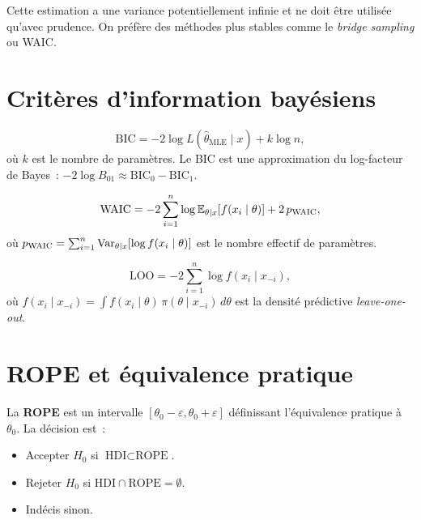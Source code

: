 \begin{attention}[title=\textbf{Instabilit\'e de la moyenne harmonique}]
Cette estimation a une variance potentiellement infinie et ne doit
\^etre utilis\'ee qu'avec prudence. On pr\'ef\`ere des m\'ethodes plus
stables comme le \textit{bridge sampling} ou WAIC.
\end{attention}

\section{Crit\`eres d'information bay\'esiens}

\begin{definition}
\[
  \text{BIC} = -2\log L(\hat{\theta}_{\text{MLE}} \mid x) + k\log n,
\]
o\`u $k$ est le nombre de param\`etres. Le BIC est une approximation du
log-facteur de Bayes~: $-2\log B_{01} \approx \text{BIC}_0 - \text{BIC}_1$.
\end{definition}

\begin{definition}
\[
  \text{WAIC} = -2\sum_{i=1}^n \log \mathbb{E}_{\theta \mid x}[f(x_i \mid \theta)]
  + 2\,p_{\text{WAIC}},
\]
o\`u $p_{\text{WAIC}} = \sum_{i=1}^n \mathrm{Var}_{\theta \mid x}[\log f(x_i \mid \theta)]$
est le nombre effectif de param\`etres.
\end{definition}

\begin{definition}
\[
  \text{LOO} = -2\sum_{i=1}^n \log f(x_i \mid x_{-i}),
\]
o\`u $f(x_i \mid x_{-i}) = \int f(x_i \mid \theta)\,\pi(\theta \mid x_{-i})\,d\theta$
est la densit\'e pr\'edictive \textit{leave-one-out}.
\end{definition}

\section{ROPE et \'equivalence pratique}

\begin{definition}
La \textbf{ROPE} est un intervalle $[\theta_0 - \varepsilon, \theta_0 + \varepsilon]$
d\'efinissant l'\'equivalence pratique \`a $\theta_0$. La d\'ecision
est~:
\begin{itemize}
  \item Accepter $H_0$ si $\text{HDI} \subset \text{ROPE}$.
  \item Rejeter $H_0$ si $\text{HDI} \cap \text{ROPE} = \emptyset$.
  \item Ind\'ecis sinon.
\end{itemize}
\end{definition}


